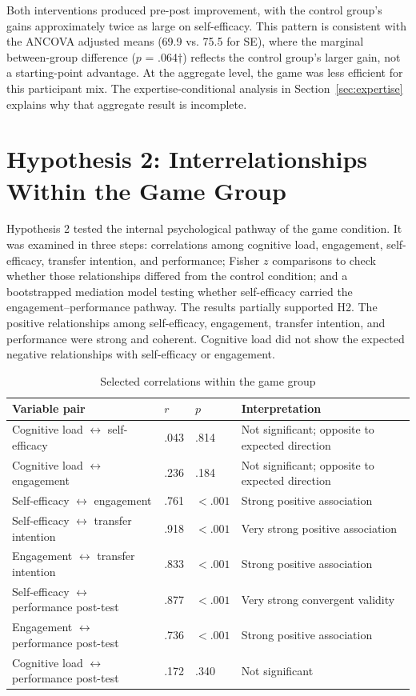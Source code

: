 \documentclass[12pt]{report}
\begin{document}
Both interventions produced pre-post improvement, with the control group's gains approximately twice as large on self-efficacy. This pattern is consistent with the ANCOVA adjusted means (69.9 vs. 75.5 for SE), where the marginal between-group difference ($p$ = .064$\dagger$) reflects the control group's larger gain, not a starting-point advantage. At the aggregate level, the game was less efficient for this participant mix. The expertise-conditional analysis in Section~\ref{sec:expertise} explains why that aggregate result is incomplete.

\section{Hypothesis 2: Interrelationships Within the Game Group}
Hypothesis 2 tested the internal psychological pathway of the game condition. It was examined in three steps: correlations among cognitive load, engagement, self-efficacy, transfer intention, and performance; Fisher $z$ comparisons to check whether those relationships differed from the control condition; and a bootstrapped mediation model testing whether self-efficacy carried the engagement--performance pathway. The results partially supported H2. The positive relationships among self-efficacy, engagement, transfer intention, and performance were strong and coherent. Cognitive load did not show the expected negative relationships with self-efficacy or engagement.

\begin{table}[htbp]
\centering
\caption{Selected correlations within the game group}
\begin{tabularx}{\textwidth}{L{4.0cm}C{1.2cm}C{1.5cm}Y}
\toprule
\textbf{Variable pair} & \textbf{$r$} & \textbf{$p$} & \textbf{Interpretation} \\
\midrule
Cognitive load $\leftrightarrow$ self-efficacy & .043 & .814 & Not significant; opposite to expected direction \\
Cognitive load $\leftrightarrow$ engagement & .236 & .184 & Not significant; opposite to expected direction \\
Self-efficacy $\leftrightarrow$ engagement & .761 & $<.001$ & Strong positive association \\
Self-efficacy $\leftrightarrow$ transfer intention & .918 & $<.001$ & Very strong positive association \\
Engagement $\leftrightarrow$ transfer intention & .833 & $<.001$ & Strong positive association \\
Self-efficacy $\leftrightarrow$ performance post-test & .877 & $<.001$ & Very strong convergent validity \\
Engagement $\leftrightarrow$ performance post-test & .736 & $<.001$ & Strong positive association \\
Cognitive load $\leftrightarrow$ performance post-test & .172 & .340 & Not significant \\
\bottomrule
\end{tabularx}
\end{table}
\end{document}
